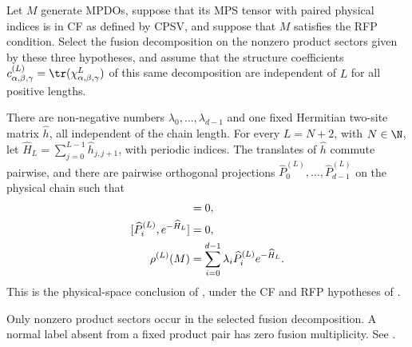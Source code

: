 \begin{theorem}%
    \label{thm:mpdo_literal_cpsv_physical_coordinate_gibbs_at_least_two}
    \leanok
    Let $M$ generate MPDOs, suppose that its MPS tensor with paired physical
    indices is in CF as defined by CPSV, and suppose that $M$ satisfies the
    RFP condition. Select the fusion decomposition on the nonzero product
    sectors given by these three hypotheses, and assume that the structure
    coefficients $c_{\alpha,\beta,\gamma}^{(L)}
        =\tr(\chi_{\alpha,\beta,\gamma}^{L})$ of this same decomposition are
    independent of $L$ for all positive lengths.

    There are non-negative numbers
    $\lambda_0,\ldots,\lambda_{d-1}$ and one fixed Hermitian two-site matrix
    $\widehat h$, all independent of the chain length. For every $L=N+2$,
    with $N\in\N$, let
    $\widehat H_L=\sum_{j=0}^{L-1}\widehat h_{j,j+1}$, with periodic indices.
    The translates of $\widehat h$ commute pairwise, and there are pairwise
    orthogonal projections
    $\widehat P_0^{(L)},\ldots,\widehat P_{d-1}^{(L)}$ on the physical chain
    such that
    \begin{align}
        [\widehat h_{j-1,j},\widehat h_{j,j+1}]
         & =0,
        \notag                                          \\
        [\widehat P_i^{(L)},e^{-\widehat H_L}]
         & =0,
        \notag                                          \\
        \rho^{(L)}(M)
         & =\sum_{i=0}^{d-1}\lambda_i\widehat P_i^{(L)}
        e^{-\widehat H_L}.
        \notag
    \end{align}
    This is the physical-space conclusion of
    \cite[lines~1013--1016]{Cirac2016MPDO_arXiv}, under the CF and RFP
    hypotheses of
    \cite[Theorem~4.14, lines~972--993]{Cirac2016MPDO_arXiv}.

    Only nonzero product sectors occur in the selected fusion decomposition.
    A normal label absent from a fixed product pair has zero fusion
    multiplicity. See
    \cite{gap:cpsv16_bnt_uniqueness_zero_coefficient}.


\end{theorem}
